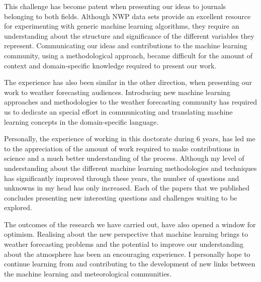 \medskip

This challenge has become patent when presenting our ideas to journals belonging to both fields. Although NWP data sets provide an excellent resource for experimenting with generic machine learning algorithms, they require an understanding about the structure and significance of the different variables they represent. Communicating our ideas and contributions to the machine learning community, using a methodological approach, became difficult for the amount of context and domain-specific knowledge required to present our work.

\medskip

The experience has also been similar in the other direction, when presenting our work to weather forecasting audiences. Introducing new machine learning approaches and methodologies to the weather forecasting community has required us to dedicate an special effort in communicating and translating machine learning concepts in the domain-specific language. 

\medskip

Personally, the experience of working in this doctorate during 6 years, has led me to the appreciation of the amount of work required to make contributions in science and a much better understanding of the process. Although my level of understanding about the different machine learning methodologies and techniques has significantly improved through these years, the number of questions and unknowns in my head has only increased. Each of the papers that we published concludes presenting new interesting questions and challenges waiting to be explored.

\medskip

The outcomes of the research we have carried out, have also opened a window for optimism. Realising about the new perspective that machine learning brings to weather forecasting problems and the potential to improve our understanding about the atmosphere has been an encouraging experience. I personally hope to continue learning from and contributing to the development of new links between the machine learning and meteorological communities.